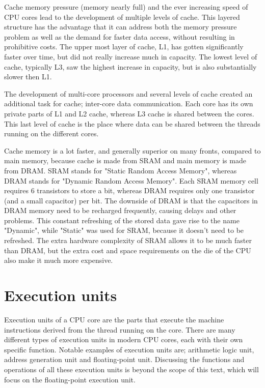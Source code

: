 Cache memory pressure (memory nearly full) and the ever increasing speed of CPU cores lead to the development of multiple levels of cache. This layered structure has the advantage that it can address both the memory pressure problem as well as the demand for faster data access, without resulting in prohibitive costs. The upper most layer of cache, L1, has gotten significantly faster over time, but did not really increase much in capacity. The lowest level of cache, typically L3, saw the highest increase in capacity, but is also substantially slower then L1.\vspace{5mm}

The development of multi-core processors and several levels of cache created an additional task for cache; inter-core data communication. Each core has its own private parts of L1 and L2 cache, whereas L3 cache is shared between the cores. This last level of cache is the place where data can be shared between the threads running on the different cores.\vspace{5mm}

\newpage

Cache memory is a lot faster, and generally superior on many fronts, compared to main memory, because cache is made from SRAM and main memory is made from DRAM. SRAM stands for "Static Random Access Memory", whereas DRAM stands for "Dynamic Random Access Memory". Each SRAM memory cell requires 6 transistors to store a bit, whereas DRAM requires only one transistor (and a small capacitor) per bit. The downside of DRAM is that the capacitors in DRAM memory need to be recharged frequently, causing delays and other problems. This constant refreshing of the stored data gave rise to the name "Dynamic", while "Static" was used for SRAM, because it doesn't need to be refreshed. The extra hardware complexity of SRAM allows it to be much faster than DRAM, but the extra cost and space requirements on the die of the CPU also make it much more expensive.

\section{Execution units}

\hspace{4mm}Execution units of a CPU core are the parts that execute the machine instructions derived from the thread running on the core. There are many different types of execution units in modern CPU cores, each with their own specific function. Notable examples of execution units are; arithmetic logic unit\autocite[]{wiki_alu}, address generation unit\autocite[]{wiki_agu} and floating-point unit\autocite[]{wiki_fpu}. Discussing the functions and operations of all these execution units is beyond the scope of this text, which will focus on the floating-point execution unit.

